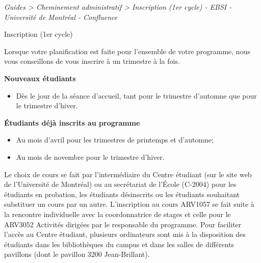 \documentclass [12 pt]{article}
\begin{document}
        
        
        \textit{
        Guides > Cheminement administratif > Inscription (1er cycle) - EBSI -
            Université de Montréal - Confluence
        }
    
        Inscription (1er cycle)
        
            Lorsque votre planification est faite pour l'ensemble de votre programme, nous vous
                conseillons de vous inscrire à un trimestre à la fois.
            
        \textbf{
        Nouveaux étudiants
        }
    
            
        \begin{itemize}
        
                
        \item Dès le jour de la séance d'accueil, tant pour le trimestre d'automne que pour le
                    trimestre d'hiver.
            
        \end{itemize}
    
            
        \textbf{
        Étudiants déjà inscrits au programme
        }
    
            
        \begin{itemize}
        
                
        \item Au mois d'avril pour les trimestres de printemps et d'automne;
                
        \item Au mois de novembre pour le trimestre d'hiver.
            
        \end{itemize}
    
            Le choix de cours se fait par l'intermédiaire du Centre étudiant (sur le site web de
                l'Université de Montréal) ou au secrétariat de l'École (C-2004) pour les étudiants
                en probation, les étudiants désinscrits ou les étudiants souhaitant substituer un
                cours par un autre. L'inscription au cours ARV1057 se fait suite à la rencontre
                individuelle avec la coordonnatrice de stages et celle pour le ARV3052 Activités
                dirigées par le responsable du programme.
            Pour faciliter l'accès au Centre étudiant, plusieurs ordinateurs sont mis à la
                disposition des étudiants dans les bibliothèques du campus et dans les salles de
                différents pavillons (dont le pavillon 3200 Jean-Brillant).
            
\end{document}
